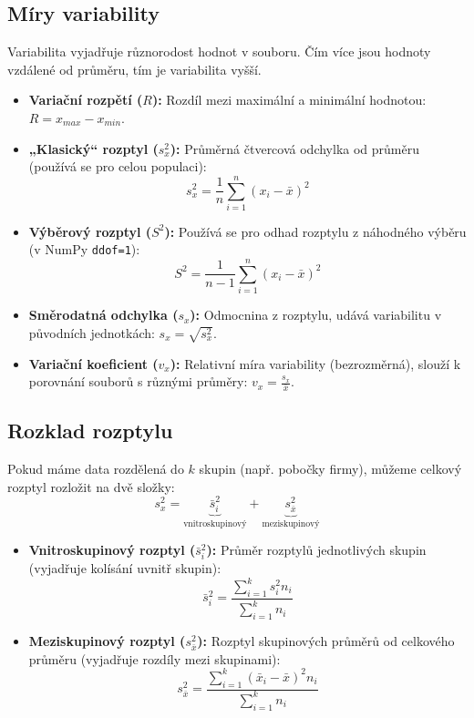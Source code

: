 \documentclass[a4paper, 11pt]{article}
\begin{document}
\subsection*{Míry variability}
Variabilita vyjadřuje různorodost hodnot v souboru. Čím více jsou hodnoty vzdálené od průměru, tím je variabilita vyšší.

\begin{itemize}
    \item \textbf{Variační rozpětí ($R$):} Rozdíl mezi maximální a minimální hodnotou: $R = x_{max} - x_{min}$.
    \item \textbf{„Klasický“ rozptyl ($s_x^2$):} Průměrná čtvercová odchylka od průměru (používá se pro celou populaci):
    \begin{equation*}
        s_x^2 = \frac{1}{n} \sum_{i=1}^{n} (x_i - \bar{x})^2 
    \end{equation*}
    \item \textbf{Výběrový rozptyl ($S^2$):} Používá se pro odhad rozptylu z náhodného výběru (v NumPy \texttt{ddof=1}):
    \begin{equation*}
        S^2 = \frac{1}{n-1} \sum_{i=1}^{n} (x_i - \bar{x})^2
    \end{equation*}
    \item \textbf{Směrodatná odchylka ($s_x$):} Odmocnina z rozptylu, udává variabilitu v původních jednotkách: $s_x = \sqrt{s_x^2}$.
    \item \textbf{Variační koeficient ($v_x$):} Relativní míra variability (bezrozměrná), slouží k porovnání souborů s různými průměry: $v_x = \frac{s_x}{\bar{x}}$.
\end{itemize}

\subsection*{Rozklad rozptylu}
Pokud máme data rozdělená do $k$ skupin (např. pobočky firmy), můžeme celkový rozptyl rozložit na dvě složky:
\begin{equation*}
    s_x^2 = \underbrace{\bar{s}_i^2}_{\text{vnitroskupinový}} + \underbrace{s_{\bar{x}}^2}_{\text{meziskupinový}}
\end{equation*}

\begin{itemize}
    \item \textbf{Vnitroskupinový rozptyl ($\bar{s}_i^2$):} Průměr rozptylů jednotlivých skupin (vyjadřuje kolísání uvnitř skupin):
    \begin{equation*}
        \bar{s}_i^2 = \frac{\sum_{i=1}^{k} s_i^2 n_i}{\sum_{i=1}^{k} n_i} 
    \end{equation*}
    \item \textbf{Meziskupinový rozptyl ($s_{\bar{x}}^2$):} Rozptyl skupinových průměrů od celkového průměru (vyjadřuje rozdíly mezi skupinami):
    \begin{equation*}
        s_{\bar{x}}^2 = \frac{\sum_{i=1}^{k} (\bar{x}_i - \bar{x})^2 n_i}{\sum_{i=1}^{k} n_i} 
    \end{equation*}
\end{itemize}
\end{document}
